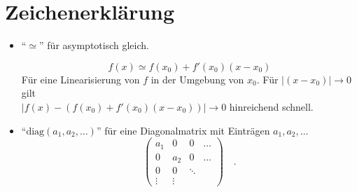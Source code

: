 \clearpage
\section*{Zeichenerklärung}

\begin{itemize}
 \item ``$\simeq$'' für asymptotisch gleich.
	\begin{beispiel}
	 \begin{equation}
	  f(x)\simeq f(x_0)+f'(x_0)(x-x_0)
	 \end{equation}
	  Für eine Linearisierung von $f$ in der Umgebung von $x_0$. Für 
	  $
	  \left|(x-x_0)\right|\rightarrow 0
	  $
	  gilt \\ 
	  $
	  \left|f(x)-\left(f(x_0)+f'(x_0)(x-x_0)\right)\right|\rightarrow 0 
	  $
	  hinreichend schnell.
	\end{beispiel}
	
	
	
	
  \item ``$\text{diag}(a_1,a_2,\ldots)$'' für eine Diagonalmatrix mit Einträgen $a_1,a_2,\ldots$
	\begin{equation}
	 \begin{pmatrix}
	  a_1 & 0   &  0& \dots \\
	  0   & a_2 & 0 & \dots \\
	  0   &  0  &\ddots & \\
	  \vdots & \vdots
	 \end{pmatrix} \quad .
	\end{equation}


      
 
 
\end{itemize}
